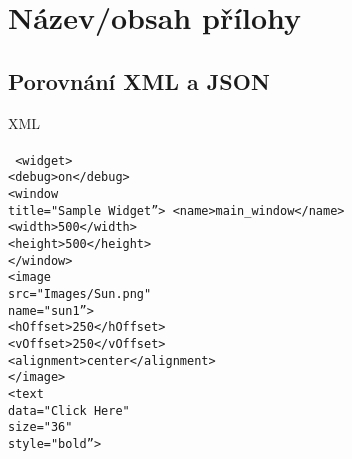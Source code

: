 \chapter{Název/obsah přílohy}
\label{prilohaa}

\section{Porovnání XML a JSON}
\label{prilohaPorovnaniXmlJson}
\begin{minipage}{0.5\textwidth}
{\Large XML}\\\\
\texttt{\small
<widget>\\
\hspace*{2mm}<debug>on</debug>\\
\hspace*{2mm}<window\\
\hspace*{4mm}title="Sample Widget\textquotedblright>
\hspace*{4mm}<name>main\_window</name>\\
\hspace*{4mm}<width>500</width>\\
\hspace*{4mm}<height>500</height>\\
\hspace*{2mm}</window>\\
\hspace*{2mm}<image\\
\hspace*{4mm}src="Images/Sun.png"\\
\hspace*{4mm}name="sun1\textquotedblright>\\
\hspace*{4mm}<hOffset>250</hOffset>\\
\hspace*{4mm}<vOffset>250</vOffset>\\
\hspace*{4mm}<alignment>center</alignment>\\
\hspace*{2mm}</image>\\
\hspace*{2mm}<text\\
\hspace*{4mm}data="Click Here"\\
\hspace*{4mm}size="36"\\
\hspace*{4mm}style="bold\textquotedblright>\\
}
\end{minipage}
